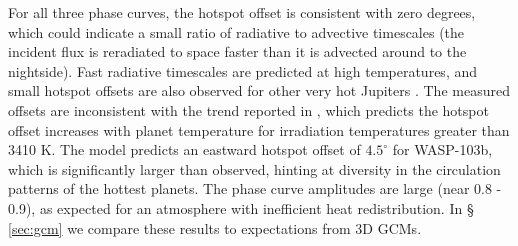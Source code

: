 \documentclass[twocolumn, trackchanges]{aastex61}
\newcommand{\project}[1]{\textsl{#1}}
\newcommand{\Spitzer}{\project{Spitzer}}
\begin{document}
For all three phase curves, the hotspot offset is consistent with zero degrees, which could indicate a small ratio of radiative to advective timescales (the incident flux is reradiated to space faster than it is advected around to the nightside). Fast radiative timescales are predicted at high temperatures, and small hotspot offsets are also observed for other very hot Jupiters \citep{perez13, komacek16, komacek17}.  The measured offsets are inconsistent with the trend reported in \cite{zhang17}, which predicts the hotspot offset increases with planet temperature for irradiation temperatures greater than 3410 K. The \cite{zhang17} model predicts an eastward hotspot offset of $4.5^\circ$ for WASP-103b, which is significantly larger than observed, hinting at diversity in the circulation patterns of the hottest planets.  The phase curve amplitudes are large (near 0.8 - 0.9), as expected for an atmosphere with inefficient heat redistribution. In \S\,\ref{sec:gcm} we compare these results to expectations from 3D GCMs.

\end{document}

